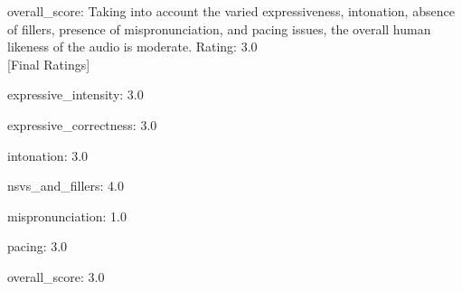 \begin{tcolorbox}[blue_box, title = {{Audio Sample 2 : Ground-truth Human-likeness Rating = 3.0}}]
overall\_score: Taking into account the varied expressiveness, intonation, absence of fillers, presence of mispronunciation, and pacing issues, the overall human likeness of the audio is moderate. Rating: 3.0 \\


[Final Ratings]

expressive\_intensity: 3.0  

expressive\_correctness: 3.0  

intonation: 3.0  

nsvs\_and\_fillers: 4.0  

mispronunciation: 1.0  

pacing: 3.0  

overall\_score: 3.0

\end{tcolorbox}




